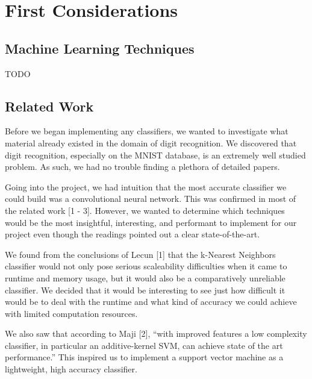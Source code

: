 \documentclass{article} %
\begin{document}
\section{First Considerations}
\subsection{Machine Learning Techniques}
TODO

\subsection{Related Work}
Before we began implementing any classifiers, we wanted to investigate what
material already existed in the domain of digit recognition. We discovered
that digit recognition, especially on the MNIST database, is an extremely well
studied problem. As such, we had no trouble finding a plethora of detailed
papers.

Going into the project, we had intuition that the most accurate classifier we
could build was a convolutional neural network. This was confirmed in most of
the related work [1 - 3].
However, we wanted to determine which techniques would be the most insightful,
interesting, and performant to implement for our project even though the
readings pointed out a clear state-of-the-art.

We found from the
conclusions of Lecun [1] that the k-Nearest Neighbors classifier would not
only pose serious scaleability difficulties when it came to runtime and memory
usage, but it would also be a comparatively unreliable classifier. We decided
that it would be interesting to see just how difficult it would be to deal with
the runtime and what kind of accuracy we could achieve with limited
computation resources.

We also saw that according to Maji [2], ``with improved features a low
complexity classifier, in particular
an additive-kernel SVM, can achieve state of the art performance.'' This
inspired us to implement a support vector machine as a lightweight, high
accuracy classifier.

\end{document}
